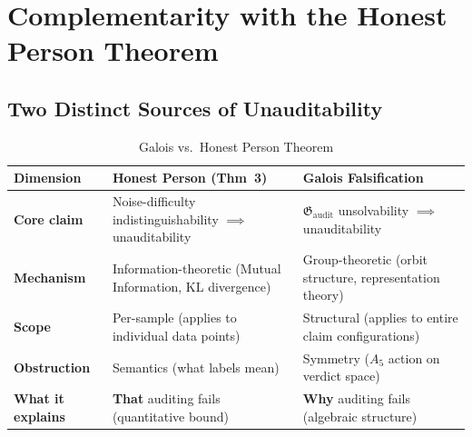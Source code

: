 \documentclass[12pt,a4paper]{article}
\theoremstyle{remark}
\newcommand{\AuditGrp}{\mathfrak{G}_{\mathrm{audit}}}
\begin{document}
\begin{center}
\end{center}
\section{Complementarity with the Honest Person Theorem}
\subsection{Two Distinct Sources of Unauditability}
\begin{table}[H]
\centering
\caption{Galois vs.\ Honest Person Theorem}
\label{tab:complement}
\begin{tabular}{@{}p{3.5cm} p{5cm} p{5cm}@{}}
\toprule
\textbf{Dimension} & \textbf{Honest Person (Thm~3)} & \textbf{Galois Falsification} \\
\midrule
\textbf{Core claim} & Noise-difficulty indistinguishability \(\implies\) unauditability & \(\AuditGrp\) unsolvability \(\implies\) unauditability \\
\textbf{Mechanism} & Information-theoretic (Mutual Information, KL divergence) & Group-theoretic (orbit structure, representation theory) \\
\textbf{Scope} & Per-sample (applies to individual data points) & Structural (applies to entire claim configurations) \\
\textbf{Obstruction} & Semantics (what labels mean) & Symmetry (\(A_5\) action on verdict space) \\
\textbf{What it explains} & \textbf{That} auditing fails (quantitative bound) & \textbf{Why} auditing fails (algebraic structure) \\
\bottomrule
\end{tabular}
\end{table}
\end{document}
